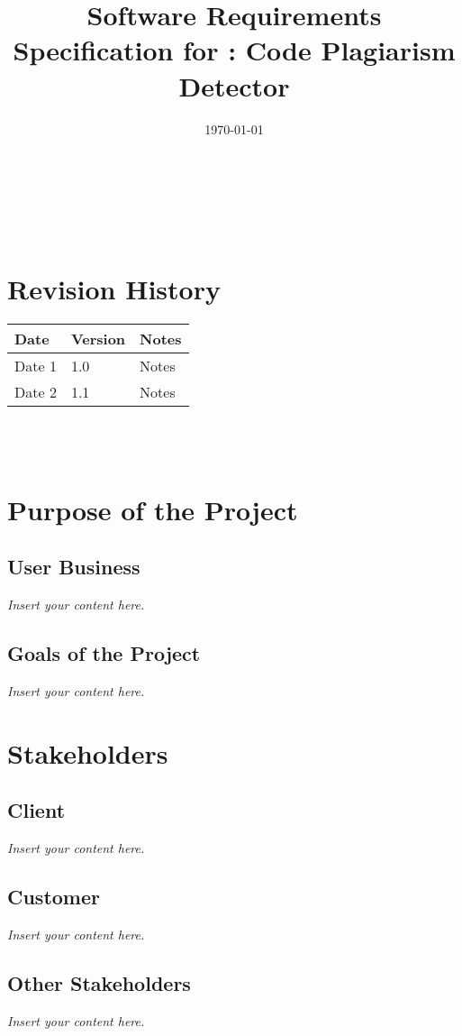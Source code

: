 \documentclass[12pt]{article}
\newcommand{\lips}{\textit{Insert your content here.}}
\begin{document}
\title{Software Requirements Specification for \progname: Code Plagiarism Detector} 
\author{\authname}
\date{\today}
	
\maketitle

~\newpage


\tableofcontents

~\newpage

\section*{Revision History}

\begin{tabularx}{\textwidth}{p{3cm}p{2cm}X}
\toprule {\textbf{Date}} & {\textbf{Version}} & {\textbf{Notes}}\\
\midrule
Date 1 & 1.0 & Notes\\
Date 2 & 1.1 & Notes\\
\bottomrule
\end{tabularx}

~\\

~\newpage
\section{Purpose of the Project}
\subsection{User Business}
\lips
\subsection{Goals of the Project}
\lips
\section{Stakeholders}
\subsection{Client}
\lips
\subsection{Customer}
\lips
\subsection{Other Stakeholders}
\lips
\end{document}
